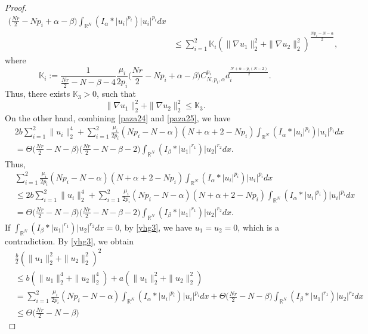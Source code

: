 \documentclass[reqno]{amsart}
\begin{document}
\begin{proof}
\begin{align*}
 \Big(\frac{Nr}{2}-Np_i+\alpha-\beta\Big)
 \int_{\mathbb{R}^N}(I_\alpha\ast|u_i|^{p_i})|u_i|^{p_i}dx\\
&\leq \sum_{i=1}^2\mathbb{K}_i(\| \nabla u_1\|_2^2
 +\| \nabla u_2\|_2^2)^{\frac{Np_i-N-\alpha}{2}},
\end{align*}
where 
\[
\mathbb{K}_i:=\frac{1}{\frac{Nr}{2}-N-\beta-4}\frac{\mu_i}{2p_i}
\Big(\frac{Nr}{2}-Np_i+\alpha-\beta\Big)C_{N,p_i,\alpha}^{p_i}
d_i^{\frac{N+\alpha-p_i(N-2)}{2}}.
\]
Thus, there exists $\mathbb{K}_3>0$, such that
\begin{equation}\label{hand1}
\| \nabla u_1\|_2^2+\| \nabla u_2\|_2^2\leq\mathbb{K}_3.
\end{equation}
On the other hand, combining \eqref{paza24} and \eqref{paza25}, we have
\begin{align*}
&2b\sum_{i=1}^2\| u_i\|_2^4+\sum_{i=1}^2\frac{\mu_i}{2p_i}
(Np_i-N-\alpha)(N+\alpha+2-Np_i)\int_{\mathbb{R}^N}(I_\alpha\ast
 |u_i|^{p_i})|u_i|^{p_i}dx\\
&= \Theta\Big(\frac{Nr}{2}-N-\beta\Big)\Big(\frac{Nr}{2}-N-\beta-2\Big)
 \int_{\mathbb{R}^N}(I_\beta\ast|u_1|^{r_1})|u_2|^{r_2}dx.
\end{align*}
Thus,
\begin{equation}\label{yhg3}
\begin{aligned}
&\sum_{i=1}^2\frac{\mu_i}{2p_i}(Np_i-N-\alpha)(N+\alpha+2-Np_i)\int_{\mathbb{R}^N}(I_\alpha\ast|u_i|^{p_i})|u_i|^{p_i}dx\\
&\leq 2b\sum_{i=1}^2\| u_i\|_2^4
+\sum_{i=1}^2\frac{\mu_i}{2p_i}(Np_i-N-\alpha)(N+\alpha+2-Np_i)\int_{\mathbb{R}^N}(I_\alpha\ast|u_i|^{p_i})|u_i|^{p_i}dx\\
&= \Theta\Big(\frac{Nr}{2}-N-\beta\Big)
\Big(\frac{Nr}{2}-N-\beta-2\Big)\int_{\mathbb{R}^N}(I_\beta\ast|u_1|^{r_1})|u_2|^{r_2}dx.
\end{aligned}
\end{equation}
If $\int_{\mathbb{R}^N}(I_\beta\ast|u_1|^{r_1})|u_2|^{r_2}dx=0$, by \eqref{yhg3}, 
we have $u_1=u_2=0$, which is a contradiction.
By \eqref{yhg3}, we obtain
\begin{align*}
&\frac{b}{2}(\| u_1\|_2^2+\| u_2\|_2^2)^2\\
&\leq b(\| u_1\|_2^4+\| u_2
\|_2^4)+a(\| u_1\|_2^2+\| u_2\|_2^2)\\
&= \sum_{i=1}^2\frac{\mu_i}{2p_i}(Np_i-N-\alpha)
\int_{\mathbb{R}^N}(I_\alpha\ast|u_i|^{p_i})|u_i|^{p_i}dx+\Theta
\Big(\frac{Nr}{2}-N-\beta\Big)\int_{\mathbb{R}^N}(I_\beta\ast|u_1|^{r_1})|u_2|^{r_2}dx\\
&\leq \Theta\Big(\frac{Nr}{2}-N-\beta\Big)

\end{align*}
\end{proof}
\end{document}
